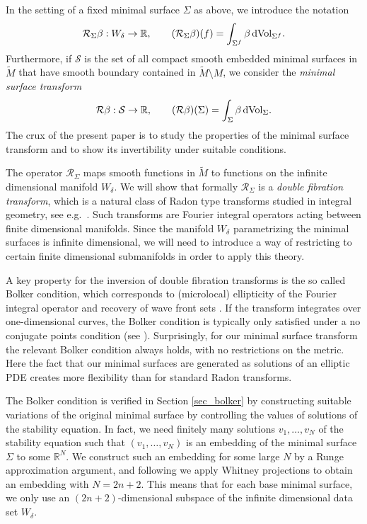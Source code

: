 \documentclass[11pt]{amsart}
\theoremstyle{definition}
\numberwithin{equation}{section}
\newcommand{\mR}{\mathbb{R}}                    %
\begin{document}
In the setting of a fixed minimal surface $\Sigma$ as above, we introduce the notation
\begin{equation} \label{rsigma_def}
\mathcal{R}_{\Sigma} \beta: W_{\delta} \to \mR, \qquad (\mathcal{R}_{\Sigma} \beta)(f) = \int_{\Sigma^f} \beta \,{\rm dVol}_{\Sigma^f}.
\end{equation}
Furthermore, if $\mathcal{S}$ is the set of all compact smooth embedded minimal surfaces in $\widetilde{M}$ that have smooth boundary contained in $\widetilde{M} \setminus M$, we consider the \emph{minimal surface transform}  
\[
\mathcal{R} \beta: \mathcal{S} \to \mR, \qquad (\mathcal{R} \beta)(\Sigma) = \int_{\Sigma} \beta \,{\rm dVol}_{\Sigma}.
\]
The crux of the present paper is to study the properties of the minimal surface transform and to show its invertibility under suitable conditions.

The operator $\mathcal{R}_{\Sigma}$ maps smooth functions in $\widetilde{M}$ to functions on the infinite dimensional manifold $W_{\delta}$. We will show that formally $\mathcal{R}_{\Sigma}$ is a \emph{double fibration transform}, which is a natural class of Radon type transforms studied in integral geometry, see e.g.\ \cite{MR516965, zbMATH02001570, zbMATH05819274, MST}. Such transforms are Fourier integral operators acting between finite dimensional manifolds. Since the manifold $W_{\delta}$ parametrizing the minimal surfaces is infinite dimensional, we will need to introduce a way of restricting to certain finite dimensional submanifolds in order to apply this theory.

A key property for the inversion of double fibration transforms is the so called Bolker condition, which corresponds to (microlocal) ellipticity of the Fourier integral operator and recovery of wave front sets \cite{MR812288}. If the transform integrates over one-dimensional curves, the Bolker condition is typically only satisfied under a no conjugate points condition (see \cite{MST}). Surprisingly, for our minimal surface transform the relevant Bolker condition always holds, with no restrictions on the metric. Here the fact that our minimal surfaces are generated as solutions of an elliptic PDE creates more flexibility than for standard Radon transforms.

The Bolker condition is verified in Section \ref{sec_bolker} by constructing suitable variations of the original minimal surface by controlling the values of solutions of the stability equation. In fact, we need finitely many solutions $v_1, \ldots, v_N$ of the stability equation such that $(v_1, \ldots, v_N)$ is an embedding of the minimal surface $\Sigma$ to some $\mR^N$. We construct such an embedding for some large $N$ by a Runge approximation argument, and following \cite{greene1975whitney, greene1975embedding, zbMATH07504299} we apply Whitney projections to obtain an embedding with $N = 2n+2$. This means that for each base minimal surface, we only use an $(2n+2)$-dimensional subspace of the infinite dimensional data set $W_{\delta}$.
\end{document}
